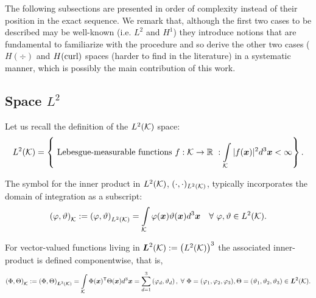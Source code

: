 The following subsections are presented in order of complexity instead of their position in the exact sequence. We remark that, although the first two cases to be described may be well-known (i.e. $L^2$ and $H^1$) they introduce notions that are fundamental to familiarize with the procedure and so derive the other two cases ($H(\div)$ and $H(\operatorname{curl})$ spaces (harder to find in the literature) in a systematic manner, which is possibly the main contribution of this work.

\subsection{Space \texorpdfstring{$L^2$}{L2}}

Let us recall the definition of the $L^2(\mathcal{K})$ space:
% 
\begin{equation*}
    L^2(\mathcal{K})=\left\{\text{ Lebesgue-measurable functions } f:\mathcal{K}\rightarrow\mathbb{R}\ : \int\limits_{\mathcal{K}}|f(\boldsymbol{x})|^2d^3\boldsymbol{x}<\infty\right\}.
\end{equation*}

The symbol for the inner product in $L^2(\mathcal{K})$, $(\cdot,\cdot)_{L^2(\mathcal{K})}$, typically incorporates the domain of integration as a subscript:
% 
\begin{equation}
    \left(\varphi,\vartheta\right)_{\mcK}:=\left(\varphi,\vartheta\right)_{L^2(\mcK)}=\int\limits_{\mcK}\varphi(\bsx)\vartheta(\bsx)d^3\bsx\ \ \ \forall\ \varphi,\vartheta\in\Leb^2(\mcK).
\end{equation}

For vector-valued functions living in $\boldsymbol{L}^2(\mathcal{K}):=\left(L^2(\mathcal{K})\right)^3$ the associated inner-product is defined componentwise, that is,
% 
\begin{equation}
    \left(\Phi,\Theta\right)_{\mcK}:=\left(\Phi,\Theta\right)_{\bLeb^2(\mcK)}=\int\limits_{\mcK}\Phi(\bsx)^\T\Theta(\bsx)d^3\bsx=\sum\limits_{d=1}^{3}\left(\varphi_d,\vartheta_d\right),\;\forall\ \Phi=(\varphi_1,\varphi_2,\varphi_3),\Theta=(\vartheta_1,\vartheta_2,\vartheta_3)\in\bLeb^2(\mcK).
\end{equation}

